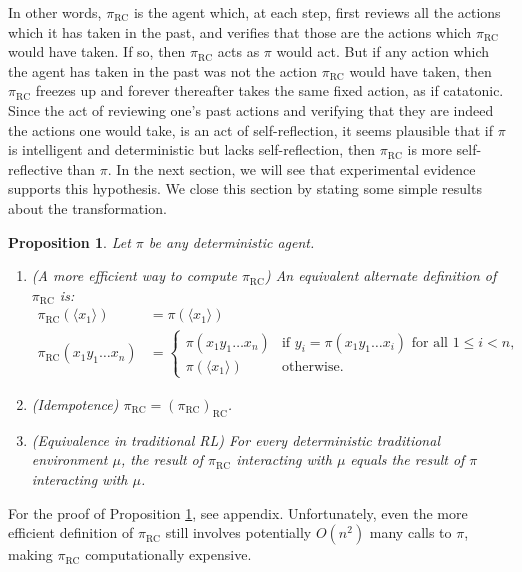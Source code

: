 \documentclass{article}
\newtheorem{myproposition}[mytheorem]{Proposition}
\def\RC{\textrm{RC}}
\begin{document}
In other words, $\pi_{\RC}$ is the agent which, at each step, first reviews all the actions
which it has taken in the past, and verifies that those are the actions which $\pi_{\RC}$ would
have taken. If so, then $\pi_{\RC}$ acts as $\pi$ would act. But if any action which
the agent has taken in the past was not the action $\pi_{\RC}$ would have taken, then
$\pi_{\RC}$ freezes up and forever thereafter takes the same fixed action, as if catatonic.
Since the act of reviewing one's past actions and verifying that they are indeed the actions
one would take, is an act of self-reflection, it seems plausible that if $\pi$
is intelligent and deterministic but lacks self-reflection, then $\pi_{\RC}$ is
more self-reflective than $\pi$. In the next section, we will see that experimental
evidence supports this hypothesis. We close this section by stating some simple results
about the transformation.

\begin{myproposition}
\label{transformationproposition}
  Let $\pi$ be any deterministic agent.
  \begin{enumerate}
    \item
    (A more efficient way to compute $\pi_{\RC}$)
    An equivalent alternate definition of $\pi_{\RC}$ is:
    \begin{align*}
      \pi_{\RC}(\langle x_1\rangle) &= \pi(\langle x_1\rangle)\\
      \pi_{\RC}(x_1y_1\ldots x_n) &=
      \begin{cases}
        \pi(x_1y_1\ldots x_n) & \mbox{if $y_i=\pi(x_1y_1\ldots x_i)$ for all $1\leq i<n$,}\\
        \pi(\langle x_1\rangle) & \mbox{otherwise.}
      \end{cases}
    \end{align*}
    \item
    (Idempotence) $\pi_{\RC}=(\pi_{\RC})_{\RC}$.
    \item
    (Equivalence in traditional RL)
    For every deterministic traditional environment $\mu$, the result of $\pi_{\RC}$
    interacting with $\mu$ equals the result of $\pi$ interacting with $\mu$.
  \end{enumerate}
\end{myproposition}

For the proof of Proposition \ref{transformationproposition}, see appendix.
Unfortunately, even the more efficient definition of $\pi_{\RC}$ still involves
potentially $O(n^2)$ many calls to $\pi$, making $\pi_{\RC}$ computationally
expensive.
\end{document}
